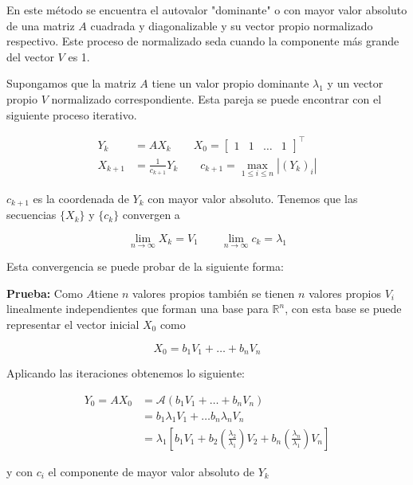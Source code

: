 En este método se encuentra el autovalor "dominante" o con mayor valor absoluto de una matriz $A$ cuadrada y diagonalizable y su vector propio normalizado respectivo. Este proceso de normalizado seda cuando la componente más grande del vector $V$ es 1.

Supongamos que la matriz $A$ tiene un valor propio dominante $\lambda_1$ y un vector propio $V$ normalizado correspondiente. Esta pareja se puede  encontrar con el siguiente proceso iterativo.

\begin{align*}
Y_{k}&=AX_{k}\qquad X_{0}=\begin{bmatrix}
1 & 1 & \dots & 1
\end{bmatrix}^{\top} \\
X_{k+1}&= \frac{1}{c_{k+1}}Y_{k} \qquad c_{k+1}=\max_{1\leq i\leq n}\left|(Y_{k})_{i}\right| 
\end{align*}

$c_{k+1}$ es la coordenada de $Y_k$ con mayor  valor absoluto. Tenemos  que las secuencias $\{X_k\}$ y $\{c_k\}$ convergen a

\begin{equation*}
    \lim_{ n \to \infty } X_{k}=V_{1}\qquad \lim_{ n \to \infty } c_{k}=\lambda_{1}
\end{equation*}

Esta convergencia se puede probar de la siguiente forma:

\textbf{Prueba:} Como $A$tiene $n$ valores propios también se tienen $n$ valores propios $V_i$ linealmente independientes que forman una base para $\mathbb{R}^n$, con esta base se puede representar el vector inicial $X_0$ como

\begin{equation*}
    X_{0}=b_{1}V_{1}+\dots +b_{n}V_{n}
\end{equation*}

Aplicando las  iteraciones obtenemos lo siguiente:

\begin{align*}
Y_{0}=AX_{0}&=\mathcal{A}(b_{1}V_{1}+\dots +b_{n}V_{n}) \\
&=b_{1}\lambda_{1}V_{1}+\dots b_{n}\lambda_{n}V_{n} \\
&=\lambda_{1}\left[b_{1}V_{1}+b_{2} \left( \frac{\lambda_{2}}{\lambda_{1}} \right)V_{2}+ b_{n} \left( \frac{\lambda_{n}}{\lambda_{1}} \right)V_{n}\right] 
\end{align*}

y con $c_i$ el componente de mayor valor absoluto de $Y_k$

